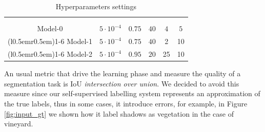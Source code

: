 \documentclass[comsoc,final]{IEEEtran}
\begin{document}
\begin{table}[htbp]
  \centering
  \caption{Hyperparameters settings \label{tab:hyperpar}}

  \begin{tabular}{c*{5}{c}}
    \toprule
    &  &   &  &  &  \\\\
    \midrule
    Model-0  & $5\cdot10^{-4}$ & $0.75$ & $40$ & $4$ & $5$ \\
    \cmidrule(l{0.5em}r{0.5em}){1-6}
    Model-1 & $5\cdot10^{-4}$ & $0.75$ & $40$ & 2 & 10 \\
    \cmidrule(l{0.5em}r{0.5em}){1-6}
    Model-2 & $5\cdot10^{-4}$ & $0.95$ & $20$ & 25 & 10 \\
    \bottomrule
  \end{tabular}
\end{table}

An usual metric that drive the learning phase and measure the quality of a segmentation task is IoU \emph{intersection over union}. We decided to avoid this measure since our self-supervised labelling system represents an approximation of the true labels, thus in some cases, it introduce errors, for example, in Figure \ref{fig:input_gt} we shown how it label shadows as vegetation in the case of vineyard. 
\end{document}
